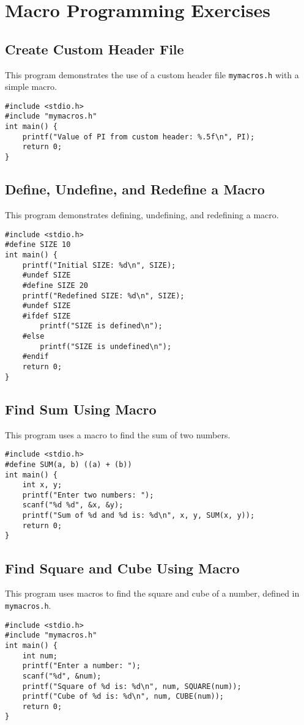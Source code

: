 \documentclass[a4paper,12pt]{article}
\begin{document}
\section{Macro Programming Exercises}

\subsection{Create Custom Header File}
This program demonstrates the use of a custom header file \texttt{mymacros.h} with a simple macro.
\begin{lstlisting}[caption={Create Custom Header File}]
#include <stdio.h>
#include "mymacros.h"
int main() {
    printf("Value of PI from custom header: %.5f\n", PI);
    return 0;
}
\end{lstlisting}
\clearpage

\subsection{Define, Undefine, and Redefine a Macro}
This program demonstrates defining, undefining, and redefining a macro.
\begin{lstlisting}[caption={Define, Undefine, and Redefine a Macro}]
#include <stdio.h>
#define SIZE 10
int main() {
    printf("Initial SIZE: %d\n", SIZE);
    #undef SIZE
    #define SIZE 20
    printf("Redefined SIZE: %d\n", SIZE);
    #undef SIZE
    #ifdef SIZE
        printf("SIZE is defined\n");
    #else
        printf("SIZE is undefined\n");
    #endif
    return 0;
}
\end{lstlisting}
\clearpage

\subsection{Find Sum Using Macro}
This program uses a macro to find the sum of two numbers.
\begin{lstlisting}[caption={Find Sum Using Macro}]
#include <stdio.h>
#define SUM(a, b) ((a) + (b))
int main() {
    int x, y;
    printf("Enter two numbers: ");
    scanf("%d %d", &x, &y);
    printf("Sum of %d and %d is: %d\n", x, y, SUM(x, y));
    return 0;
}
\end{lstlisting}
\clearpage

\subsection{Find Square and Cube Using Macro}
This program uses macros to find the square and cube of a number, defined in \texttt{mymacros.h}.
\begin{lstlisting}[caption={Find Square and Cube Using Macro}]
#include <stdio.h>
#include "mymacros.h"
int main() {
    int num;
    printf("Enter a number: ");
    scanf("%d", &num);
    printf("Square of %d is: %d\n", num, SQUARE(num));
    printf("Cube of %d is: %d\n", num, CUBE(num));
    return 0;
}
\end{lstlisting}
\clearpage
\end{document}
